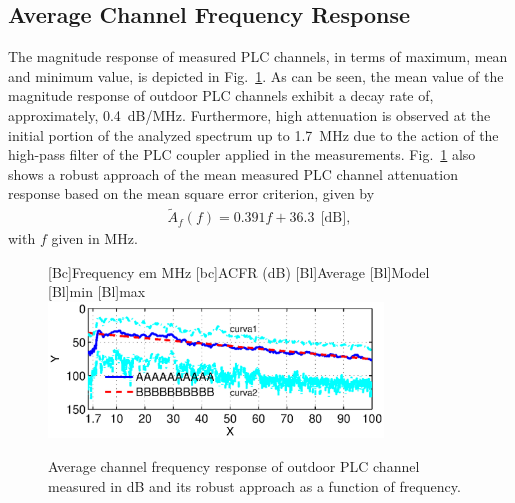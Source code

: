 \documentclass[journal]{IEEEtran}
\newcommand{\tamfig}{3.5in}    %
\begin{document}
\subsection{Average Channel Frequency Response}
The magnitude response of measured PLC channels, in terms of maximum, mean and minimum value, is depicted in Fig.~\ref{Fig:CFRmedia}. As can be seen, the mean value of the magnitude response of outdoor PLC channels exhibit a decay rate of, approximately, 0.4~dB/MHz. Furthermore, high attenuation is observed at the initial portion of the analyzed spectrum up to 1.7~MHz due to the action of the high-pass filter of the PLC coupler applied in the measurements. Fig.~\ref{Fig:CFRmedia} also shows a robust approach of the mean measured PLC channel attenuation response based on the mean square error criterion, given by
\begin{eqnarray} \label{eq-CFRmedia}
\widetilde{A}_f(f) = 0.391f+36.3 \   \  \mbox{[dB]},   
\end{eqnarray}
with $f$ given in MHz.

\begin{figure}[!htp]
	\begin{centering}
		[Bc]{Frequency em MHz}    
		[bc]{ACFR (dB)}
		[Bl]{Average}
		[Bl]{Model}
		[Bl]{min}
		[Bl]{max}		
		\includegraphics[width=\tamfig]{Figuras/CFRmedia.eps}
		\caption{Average channel frequency response of outdoor PLC channel measured in dB and its robust approach as a function of frequency.}
		\label{Fig:CFRmedia}
	\end{centering}
\end{figure}
\end{document}
